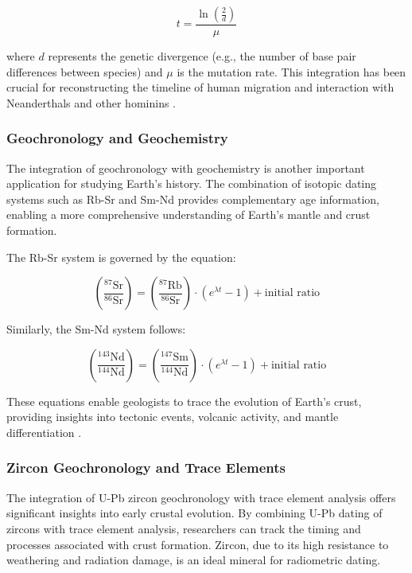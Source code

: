 \documentclass{article}
\begin{document}
\begin{equation}
t = \frac{\ln\left(\frac{2}{d}\right)}{\mu}
\end{equation}

where \( d \) represents the genetic divergence (e.g., the number of base pair differences between species) and \(\mu\) is the mutation rate. This integration has been crucial for reconstructing the timeline of human migration and interaction with Neanderthals and other hominins \cite{Green2010Neanderthal}.

\subsubsection*{Geochronology and Geochemistry}

The integration of geochronology with geochemistry is another important application for studying Earth's history. The combination of isotopic dating systems such as Rb-Sr and Sm-Nd provides complementary age information, enabling a more comprehensive understanding of Earth's mantle and crust formation.

The Rb-Sr system is governed by the equation:

\begin{equation}
\left( \frac{^{87}\text{Sr}}{^{86}\text{Sr}} \right) = \left( \frac{^{87}\text{Rb}}{^{86}\text{Sr}} \right) \cdot (e^{\lambda t} - 1) + \text{initial ratio}
\end{equation}

Similarly, the Sm-Nd system follows:

\begin{equation}
\left( \frac{^{143}\text{Nd}}{^{144}\text{Nd}} \right) = \left( \frac{^{147}\text{Sm}}{^{144}\text{Nd}} \right) \cdot (e^{\lambda t} - 1) + \text{initial ratio}
\end{equation}

These equations enable geologists to trace the evolution of Earth's crust, providing insights into tectonic events, volcanic activity, and mantle differentiation \cite{Zhao2019Geochemical}.

\subsubsection*{Zircon Geochronology and Trace Elements}

The integration of U-Pb zircon geochronology with trace element analysis offers significant insights into early crustal evolution. By combining U-Pb dating of zircons with trace element analysis, researchers can track the timing and processes associated with crust formation. Zircon, due to its high resistance to weathering and radiation damage, is an ideal mineral for radiometric dating.
\end{document}
